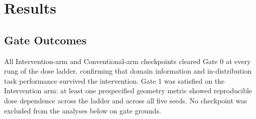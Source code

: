%
%
%

\section{Results}
\label{sec:results}

\subsection{Gate Outcomes}

All Intervention-arm and Conventional-arm checkpoints cleared Gate 0 at every
rung of the dose ladder, confirming that domain information and
in-distribution task performance survived the intervention. Gate 1 was
satisfied on the Intervention arm: at least one prespecified geometry metric
showed reproducible dose dependence across the ladder and across all five
seeds. No checkpoint was excluded from the analyses below on gate grounds.

